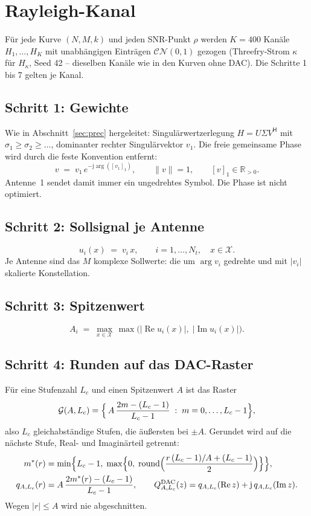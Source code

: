 \documentclass[11pt,a4paper]{article}
\newcommand{\re}{\operatorname{Re}}
\newcommand{\im}{\operatorname{Im}}
\newcommand{\Qd}{Q^{\mathrm{DAC}}}
\newcommand{\schritt}[1]{\subsection*{Schritt #1}}
\begin{document}
\section{Rayleigh-Kanal}\label{sec:ray}

Für jede Kurve $(N,M,k)$ und jeden SNR-Punkt $\rho$ werden $K=400$ Kanäle $H_1,\dots,H_K$ mit
unabhängigen Einträgen $\mathcal{CN}(0,1)$ gezogen (Threefry-Strom $\kappa$ für $H_\kappa$, Seed 42 -- dieselben
Kanäle wie in den Kurven ohne DAC). Die Schritte 1 bis 7 gelten je Kanal.

\schritt{1: Gewichte}
Wie in Abschnitt~\ref{sec:prec} hergeleitet: Singulärwertzerlegung $H=U\Sigma V^{\mathsf H}$ mit
$\sigma_1\ge\sigma_2\ge\dots$, dominanter rechter Singulärvektor $v_1$. Die freie gemeinsame Phase
wird durch die feste Konvention entfernt:
\begin{equation}
v \;=\; v_1\,e^{-\mathrm j\arg([v_1]_1)},\qquad \|v\|=1,\qquad [v]_1\in\mathbb R_{>0}.
\end{equation}
Antenne~1 sendet damit immer ein ungedrehtes Symbol. Die Phase ist nicht optimiert.

\schritt{2: Sollsignal je Antenne}
\begin{equation}
u_i(x)\;=\;v_i\,x,\qquad i=1,\dots,N_t,\quad x\in\mathcal X .
\end{equation}
Je Antenne sind das $M$ komplexe Sollwerte: die um $\arg v_i$ gedrehte und mit $|v_i|$ skalierte
Konstellation.

\schritt{3: Spitzenwert}
\begin{equation}
A_i\;=\;\max_{x\in\mathcal X}\,\max\bigl(|\re u_i(x)|,\;|\im u_i(x)|\bigr).
\end{equation}

\schritt{4: Runden auf das DAC-Raster}
Für eine Stufenzahl $L_c$ und einen Spitzenwert $A$ ist das Raster
\begin{equation}
\mathcal G(A,L_c)=\Bigl\{\,A\,\frac{2m-(L_c-1)}{L_c-1}\;:\;m=0,\dots,L_c-1\Bigr\},
\end{equation}
also $L_c$ gleichabständige Stufen, die äußersten bei $\pm A$. Gerundet wird auf die nächste Stufe,
Real- und Imaginärteil getrennt:
\begin{align}
m^\ast(r)&=\min\Bigl\{L_c-1,\;\max\Bigl\{0,\;\operatorname{round}\Bigl(\frac{r\,(L_c-1)/A+(L_c-1)}{2}\Bigr)\Bigr\}\Bigr\},\\
q_{A,L_c}(r)&=A\,\frac{2m^\ast(r)-(L_c-1)}{L_c-1},\qquad
\Qd_{A,L_c}(z)=q_{A,L_c}(\re z)+\mathrm j\,q_{A,L_c}(\im z).
\end{align}
Wegen $|r|\le A$ wird nie abgeschnitten.
\end{document}
